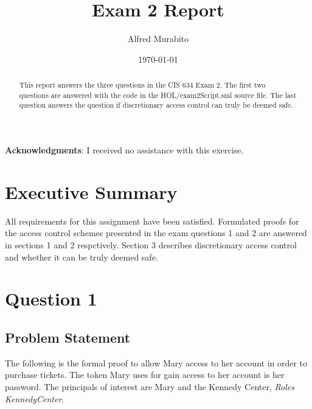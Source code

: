 \documentclass[11pt, twoside]{article}
\title{Exam 2 Report}
\author{Alfred Murabito}
\date{\today}
\begin{document}
\maketitle{}

\newpage

\begin{abstract}
This report answers the three questions in the CIS 634 Exam 2. The 
first two questions are answered with the code in the HOL/exam2Script.sml
source file. The last question answers the question if discretionary access 
control can truly be deemed safe.
\end{abstract}

\newpage

\textbf{Acknowledgments}: I received no assistance with this exercise.

\newpage

\tableofcontents

\newpage

\section{Executive Summary}
\label{sec:executive-summary}



All requirements for this assignment have been satisfied. Formulated proofs for the access control schemes
presented in the exam questions 1 and 2 are answered in sections 1 and 2 respctively. Section 3 describes discretionary access
control and whether it can be truly deemed safe.

\newpage

\section{Question 1}
\label{sec:question-1}

\subsection{Problem Statement}
\label{sec:problem-statement}

The following is the formal proof to allow Mary access to her
account in order to purchase tickets. The token Mary uses for gain access to 
her account is her password. The principals of interest are Mary 
and the Kennedy Center, \textit{Roles KennedyCenter}.

\end{document}
